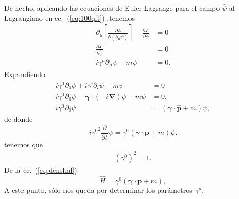 De hecho, aplicando las ecuaciones de Euler-Lagrange para el campo $\bar{\psi}$ al Lagrangiano en ec.~(\ref{eq:100qft}) ,tenemos
\begin{align}
  \partial_\mu\left[\frac{\partial\mathcal{L}}{\partial\left(\partial_\mu\bar{\psi}\right)}\right]-\frac{\partial\mathcal{L}}{\partial\bar{\psi}}&=0\nonumber\\
  \frac{\partial\mathcal{L}}{\partial\bar{\psi}}&=0\nonumber\\
  \label{eq:114qftm}
  i\gamma^\mu\partial_\mu\psi-m\psi&=0.
\end{align}
Expandiendo
\begin{align*}
  i\gamma^0\partial_0\psi+i\gamma^i\partial_i\psi-m\psi&=0\\
  i\gamma^0\partial_0\psi-\boldsymbol{\gamma}\cdot(-i\boldsymbol{\nabla})\psi-m\psi&=0,\\
  i\gamma^0\partial_0\psi&=(\boldsymbol{\gamma}\cdot\hat{\mathbf{p}}+m)\psi,
\end{align*}
de donde
\begin{equation}
    i{\gamma^0}^2\frac{\partial}{\partial t}\psi=\gamma^0(\boldsymbol{\gamma}\cdot\mathbf{p}+m)\psi.
\end{equation}
 tenemos que
\begin{align}
  \label{eq:gamma02}
  \left(\gamma^0\right)^2=1.
\end{align}
De la ec.~(\ref{eq:denshal})
\begin{equation}
  \label{eq:186qft}
  \hat{H}= \gamma^0(\boldsymbol{\gamma}\cdot\mathbf{p}+m),
\end{equation}
A este punto, sólo nos queda por determinar los parámetros $\gamma^\mu$. 

